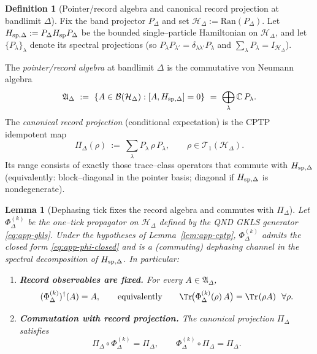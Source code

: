 \documentclass[10pt]{article}
\theoremstyle{definition}
\newtheorem{definition}{Definition}[section]
\theoremstyle{plain}
\newtheorem{lemma}{Lemma}[section]
\begin{document}
\begin{definition}[Pointer/record algebra and canonical record projection at bandlimit $\Delta$]
\label{def:pointer-algebra-projection}
Fix the band projector $P_\Delta$ and set $\mathcal H_\Delta:=\mathrm{Ran}(P_\Delta)$.
Let $H_{{\rm sp},\Delta}:=P_\Delta H_{\rm sp}P_\Delta$ be the bounded single--particle Hamiltonian on
$\mathcal H_\Delta$, and let $\{P_\lambda\}_\lambda$ denote its spectral projections
(so $P_\lambda P_{\lambda'}=\delta_{\lambda\lambda'}P_\lambda$ and $\sum_\lambda P_\lambda=I_{\mathcal H_\Delta}$).

The \emph{pointer/record algebra} at bandlimit $\Delta$ is the commutative von Neumann algebra
\[
\mathfrak A_\Delta\ :=\ \{A\in\mathcal B(\mathcal H_\Delta):[A,H_{{\rm sp},\Delta}]=0\}
\ =\ \bigoplus_\lambda \mathbb C\,P_\lambda.
\]
The \emph{canonical record projection} (conditional expectation) is the CPTP idempotent map
\begin{equation}
\Pi_\Delta(\rho)\ :=\ \sum_\lambda P_\lambda\,\rho\,P_\lambda,
\qquad \rho\in\mathcal T_1(\mathcal H_\Delta).
\label{eq:PiDelta}
\end{equation}
Its range consists of exactly those trace--class operators that commute with $H_{{\rm sp},\Delta}$
(equivalently: block--diagonal in the pointer basis; diagonal if $H_{{\rm sp},\Delta}$ is nondegenerate).
\end{definition}

\begin{lemma}[Dephasing tick fixes the record algebra and commutes with $\Pi_\Delta$]
\label{lem:tick-fixes-record-algebra}
Let $\Phi_\Delta^{(k)}$ be the one--tick propagator on $\mathcal H_\Delta$ defined by the QND GKLS generator
\eqref{eq:app-gkls}. Under the hypotheses of Lemma~\ref{lem:app-cptp}, $\Phi_\Delta^{(k)}$ admits the closed
form \eqref{eq:app-phi-closed} and is a (commuting) dephasing channel in the spectral decomposition of
$H_{{\rm sp},\Delta}$. In particular:
\begin{enumerate}[leftmargin=2.0em]
\item \textbf{Record observables are fixed.} For every $A\in\mathfrak A_\Delta$,
\[
(\Phi_\Delta^{(k)})^\dagger(A)=A,
\qquad\text{equivalently}\qquad
\Tr\!\big(\Phi_\Delta^{(k)}(\rho)\,A\big)=\Tr(\rho A)\ \ \forall\rho.
\]
\item \textbf{Commutation with record projection.} The canonical projection $\Pi_\Delta$ satisfies
\[
\Pi_\Delta\circ \Phi_\Delta^{(k)}=\Pi_\Delta,
\qquad
\Phi_\Delta^{(k)}\circ \Pi_\Delta=\Pi_\Delta.
\]
\end{enumerate}
\end{lemma}
\end{document}
